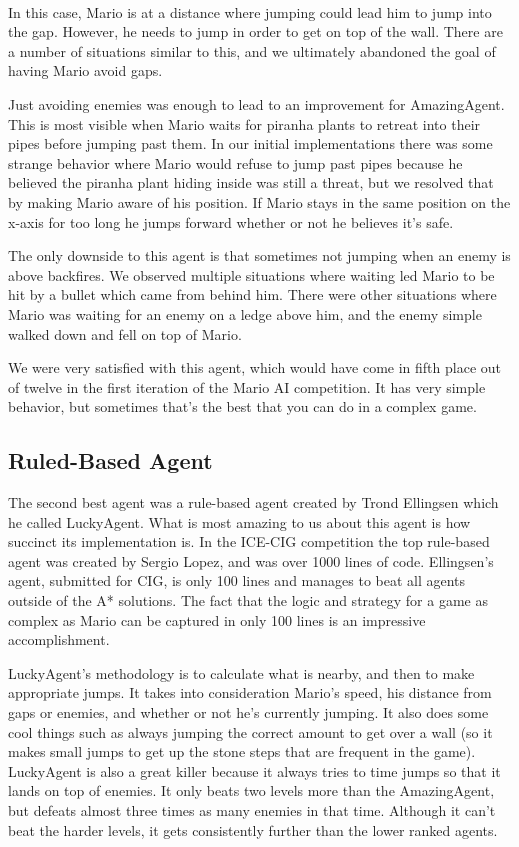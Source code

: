 \documentclass[12pt]{article}
\begin{document}
\begin{multicols*}{2}
\hspace{5mm}
\\
In this case, Mario is at a distance where jumping could lead him to jump into the gap.  However, 
he needs to jump in order to get on top of the wall.  There are a number of situations similar to 
this, and we ultimately abandoned the goal of having Mario avoid gaps.

Just avoiding enemies was enough to lead to an improvement for AmazingAgent.  This is most 
visible when Mario waits for piranha plants to retreat into their pipes before jumping past them.  
In our initial implementations there was some strange behavior 
where Mario would refuse to jump past pipes because he believed 
the piranha plant hiding inside was still a threat, 
but we resolved that by making Mario aware of his position.  If 
Mario stays in the same position on the x-axis for too long he jumps forward whether or not he believes 
it's safe.

The only downside to this agent is that sometimes not jumping when an enemy is above backfires.  
We observed multiple situations where waiting led Mario to be hit by a bullet which came from behind 
him.  There were other situations where Mario was waiting for an enemy on a ledge above him, and 
the enemy simple walked down and fell on top of Mario.

We were very satisfied with this agent, which would have come in fifth place out of twelve in the 
first iteration of the Mario AI competition.  It has very simple behavior, but sometimes that's the best 
that you can do in a complex game.

\subsection*{Ruled-Based Agent}
The second best agent was a rule-based agent created by Trond Ellingsen which he called 
LuckyAgent.  What is most amazing to us about this agent is how succinct its implementation is.  
In the ICE-CIG competition the top rule-based agent was created by Sergio Lopez, and was over 
1000 lines of code.  Ellingsen's agent, submitted for CIG, is only 100 lines 
and manages to beat all agents outside of the 
A* solutions.  The fact that the logic and strategy for a game as complex as Mario can be captured 
in only 100 lines is an impressive accomplishment.

LuckyAgent's methodology is to calculate what is nearby, and then to make appropriate jumps.  It takes 
into consideration Mario's speed, his distance from gaps or enemies, and whether or not he's 
currently jumping.  It also does some cool things such as always jumping the correct amount to 
get over a wall (so it makes small jumps to get up the stone steps that are frequent in the game).  
LuckyAgent is also a great killer because it always tries to time jumps so that it lands 
on top of enemies.  It only beats two levels more than the AmazingAgent, but defeats almost three 
times as many enemies in that time.  Although it can't beat the harder levels, it gets consistently further 
than the lower ranked agents.


\end{multicols*}
\end{document}

